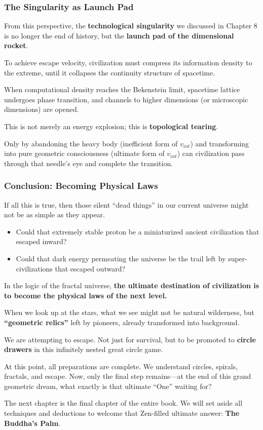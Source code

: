 \subsubsection{The Singularity as Launch Pad}

From this perspective, the \textbf{technological singularity} we discussed in Chapter 8 is no longer the end of history, but the \textbf{launch pad of the dimensional rocket}.

To achieve escape velocity, civilization must compress its information density to the extreme, until it collapses the continuity structure of spacetime.

When computational density reaches the Bekenstein limit, spacetime lattice undergoes phase transition, and channels to higher dimensions (or microscopic dimensions) are opened.

This is not merely an energy explosion; this is \textbf{topological tearing}.

Only by abandoning the heavy body (inefficient form of $v_{int}$) and transforming into pure geometric consciousness (ultimate form of $v_{int}$) can civilization pass through that needle's eye and complete the transition.

\subsubsection{Conclusion: Becoming Physical Laws}

If all this is true, then those silent ``dead things'' in our current universe might not be as simple as they appear.

\begin{itemize}
\item Could that extremely stable proton be a miniaturized ancient civilization that escaped inward?

\item Could that dark energy permeating the universe be the trail left by super-civilizations that escaped outward?
\end{itemize}

In the logic of the fractal universe, \textbf{the ultimate destination of civilization is to become the physical laws of the next level.}

When we look up at the stars, what we see might not be natural wilderness, but \textbf{``geometric relics''} left by pioneers, already transformed into background.

We are attempting to escape. Not just for survival, but to be promoted to \textbf{circle drawers} in this infinitely nested great circle game.

At this point, all preparations are complete. We understand circles, spirals, fractals, and escape. Now, only the final step remains---at the end of this grand geometric dream, what exactly is that ultimate ``One'' waiting for?

The next chapter is the final chapter of the entire book. We will set aside all techniques and deductions to welcome that Zen-filled ultimate answer: \textbf{The Buddha's Palm}.

